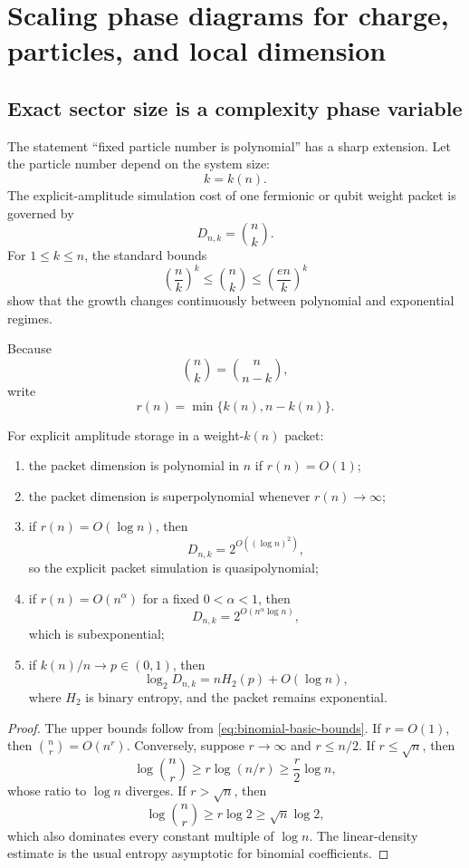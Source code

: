 \chapter{Scaling phase diagrams for charge, particles, and local dimension}
\label{ch:scaling-phases}

\section{Exact sector size is a complexity phase variable}
The statement ``fixed particle number is polynomial'' has a sharp extension. Let the particle number depend on the system size:
\[
k=k(n).
\]
The explicit-amplitude simulation cost of one fermionic or qubit weight packet is governed by
\[
D_{n,k}=\binom nk.
\]
For $1\le k\le n$, the standard bounds
\begin{equation}
\left(\frac nk\right)^k
\le
\binom nk
\le
\left(\frac{en}{k}\right)^k
\label{eq:binomial-basic-bounds}
\end{equation}
show that the growth changes continuously between polynomial and exponential regimes.

Because
\[
\binom nk=\binom n{n-k},
\]
write
\[
r(n)=\min\{k(n),n-k(n)\}.
\]

\begin{theorem}
\label{thm:charge-phase-diagram}
For explicit amplitude storage in a weight-$k(n)$ packet:
\begin{enumerate}
\item the packet dimension is polynomial in $n$ if $r(n)=O(1)$;
\item the packet dimension is superpolynomial whenever $r(n)\to\infty$;
\item if $r(n)=O(\log n)$, then
\[
D_{n,k}=2^{O((\log n)^2)},
\]
so the explicit packet simulation is quasipolynomial;
\item if $r(n)=O(n^\alpha)$ for a fixed $0<\alpha<1$, then
\[
D_{n,k}=2^{O(n^\alpha\log n)},
\]
which is subexponential;
\item if $k(n)/n\to p\in(0,1)$, then
\[
\log_2 D_{n,k}
=
nH_2(p)+O(\log n),
\]
where $H_2$ is binary entropy, and the packet remains exponential.
\end{enumerate}
\end{theorem}

\begin{proof}
The upper bounds follow from \cref{eq:binomial-basic-bounds}. If $r=O(1)$, then $\binom nr=O(n^r)$. Conversely, suppose $r\to\infty$ and $r\le n/2$. If $r\le\sqrt n$, then
\[
\log\binom nr
\ge
r\log(n/r)
\ge
\frac r2\log n,
\]
whose ratio to $\log n$ diverges. If $r>\sqrt n$, then
\[
\log\binom nr
\ge
r\log2
\ge
\sqrt n\log2,
\]
which also dominates every constant multiple of $\log n$. The linear-density estimate is the usual entropy asymptotic for binomial coefficients.
\end{proof}

